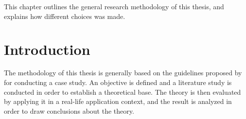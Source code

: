 
This chapter outlines the general research methodology of this thesis,
and explains how different choices was made.\\

\section{Introduction}
The methodology of this thesis is generally based on the guidelines
proposed by \citet{article:casestudies} for conducting a case study.
An objective is defined and a literature study is conducted in
order to establish a theoretical base. The theory is then evaluated by
applying it in a real-life application context, and the result is
analyzed in order to draw conclusions about the theory.
